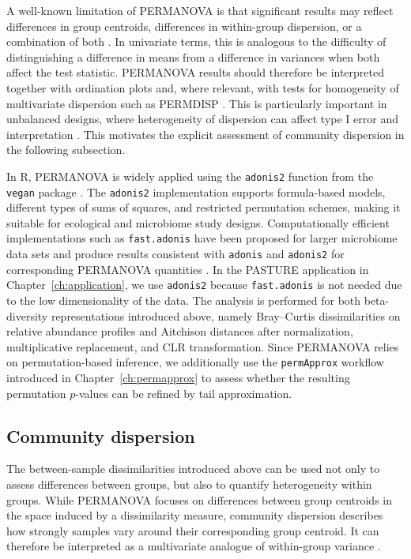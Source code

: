 A well-known limitation of PERMANOVA is that significant results may reflect differences in group centroids, differences in within-group dispersion, or a combination of both \citep{anderson2006distance,warton2012distance}. In univariate terms, this is analogous to the difficulty of distinguishing a difference in means from a difference in variances when both affect the test statistic. PERMANOVA results should therefore be interpreted together with ordination plots and, where relevant, with tests for homogeneity of multivariate dispersion such as PERMDISP \citep{anderson2006distance}. This is particularly important in unbalanced designs, where heterogeneity of dispersion can affect type I error and interpretation \citep{anderson2013permanova}. This motivates the explicit assessment of community dispersion in the following subsection.

In R, PERMANOVA is widely applied using the \texttt{adonis2} function from the \texttt{vegan} package \citep{oksanen2024vegan}. The \texttt{adonis2} implementation supports formula-based models, different types of sums of squares, and restricted permutation schemes, making it suitable for ecological and microbiome study designs. Computationally efficient implementations such as \texttt{fast.adonis} have been proposed for larger microbiome data sets and produce results consistent with \texttt{adonis} and \texttt{adonis2} for corresponding PERMANOVA quantities \citep{li2022fastadonis}. In the PASTURE application in Chapter~\ref{ch:application}, we use \texttt{adonis2} because \texttt{fast.adonis} is not needed due to the low dimensionality of the data. The analysis is performed for both beta-diversity representations introduced above, namely Bray--Curtis dissimilarities on relative abundance profiles and Aitchison distances after normalization, multiplicative replacement, and CLR transformation. Since PERMANOVA relies on permutation-based inference, we additionally use the \texttt{permApprox} workflow introduced in Chapter~\ref{ch:permapprox} to assess whether the resulting permutation $p$-values can be refined by tail approximation.


\subsection{Community dispersion}
\label{sec:3community:between:dispersion}

The between-sample dissimilarities introduced above can be used not only to assess differences between groups, but also to quantify heterogeneity within groups. While PERMANOVA focuses on differences between group centroids in the space induced by a dissimilarity measure, community dispersion describes how strongly samples vary around their corresponding group centroid. It can therefore be interpreted as a multivariate analogue of within-group variance \citep{anderson2006distance}.

